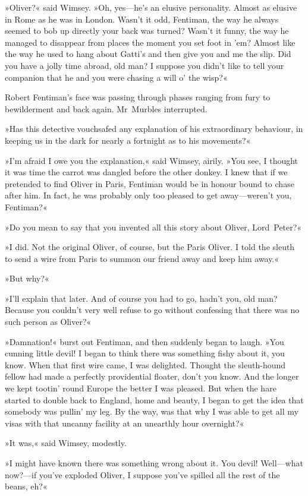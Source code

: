 »Oliver?« said Wimsey. »Oh, yes—he's an elusive personality. Almost as elusive in Rome as he was in London. Wasn't it odd, Fentiman, the way he always seemed to bob up directly your back was turned? Wasn't it funny, the way he managed to disappear from places the moment you set foot in 'em? Almost like the way he used to hang about Gatti's and then give you and me the slip. Did you have a jolly time abroad, old man? I suppose you didn't like to tell your companion that he and you were chasing a will o' the wisp?«

Robert Fentiman's face was passing through phases ranging from fury to bewilderment and back again. Mr~Murbles interrupted.

»Has this detective vouchsafed any explanation of his extraordinary behaviour, in keeping us in the dark for nearly a fortnight as to his movements?«

»I'm afraid I owe you the explanation,« said Wimsey, airily. »You see, I thought it was time the carrot was dangled before the other donkey. I knew that if we pretended to find Oliver in Paris, Fentiman would be in honour bound to chase after him. In fact, he was probably only too pleased to get away—weren't you, Fentiman?«

»Do you mean to say that you invented all this story about Oliver, Lord~Peter?«

»I did. Not the original Oliver, of course, but the Paris Oliver. I told the sleuth to send a wire from Paris to summon our friend away and keep him away.«

»But why?«

»I'll explain that later. And of course you had to go, hadn't you, old man? Because you couldn't very well refuse to go without confessing that there was no such person as Oliver?«

»Damnation!« burst out Fentiman, and then suddenly began to laugh. »You cunning little devil! I began to think there was something fishy about it, you know. When that first wire came, I was delighted. Thought the sleuth-hound fellow had made a perfectly providential floater, don't you know. And the longer we kept tootin' round Europe the better I was pleased. But when the hare started to double back to England, home and beauty, I began to get the idea that somebody was pullin' my leg. By the way, was that why I was able to get all my visas with that uncanny facility at an unearthly hour overnight?«

»It was,« said Wimsey, modestly.

»I might have known there was something wrong about it. You devil! Well—what now?—if you've exploded Oliver, I suppose you've spilled all the rest of the beans, eh?«

